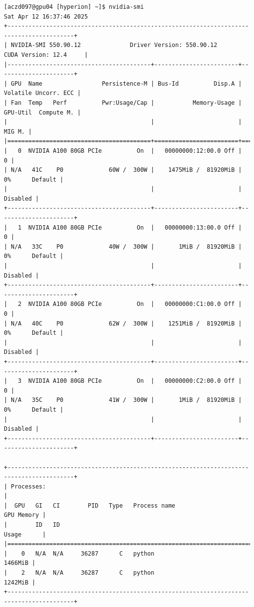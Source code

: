 \begin{verbatim}
[aczd097@gpu04 [hyperion] ~]$ nvidia-smi
Sat Apr 12 16:37:46 2025       
+-----------------------------------------------------------------------------------------+
| NVIDIA-SMI 550.90.12              Driver Version: 550.90.12      CUDA Version: 12.4     |
|-----------------------------------------+------------------------+----------------------+
| GPU  Name                 Persistence-M | Bus-Id          Disp.A | Volatile Uncorr. ECC |
| Fan  Temp   Perf          Pwr:Usage/Cap |           Memory-Usage | GPU-Util  Compute M. |
|                                         |                        |               MIG M. |
|=========================================+========================+======================|
|   0  NVIDIA A100 80GB PCIe          On  |   00000000:12:00.0 Off |                    0 |
| N/A   41C    P0             60W /  300W |    1475MiB /  81920MiB |      0%      Default |
|                                         |                        |             Disabled |
+-----------------------------------------+------------------------+----------------------+
|   1  NVIDIA A100 80GB PCIe          On  |   00000000:13:00.0 Off |                    0 |
| N/A   33C    P0             40W /  300W |       1MiB /  81920MiB |      0%      Default |
|                                         |                        |             Disabled |
+-----------------------------------------+------------------------+----------------------+
|   2  NVIDIA A100 80GB PCIe          On  |   00000000:C1:00.0 Off |                    0 |
| N/A   40C    P0             62W /  300W |    1251MiB /  81920MiB |      0%      Default |
|                                         |                        |             Disabled |
+-----------------------------------------+------------------------+----------------------+
|   3  NVIDIA A100 80GB PCIe          On  |   00000000:C2:00.0 Off |                    0 |
| N/A   35C    P0             41W /  300W |       1MiB /  81920MiB |      0%      Default |
|                                         |                        |             Disabled |
+-----------------------------------------+------------------------+----------------------+
                                                                                         
+-----------------------------------------------------------------------------------------+
| Processes:                                                                              |
|  GPU   GI   CI        PID   Type   Process name                              GPU Memory |
|        ID   ID                                                               Usage      |
|=========================================================================================|
|    0   N/A  N/A     36287      C   python                                       1466MiB |
|    2   N/A  N/A     36287      C   python                                       1242MiB |
+-----------------------------------------------------------------------------------------+


\end{verbatim}
